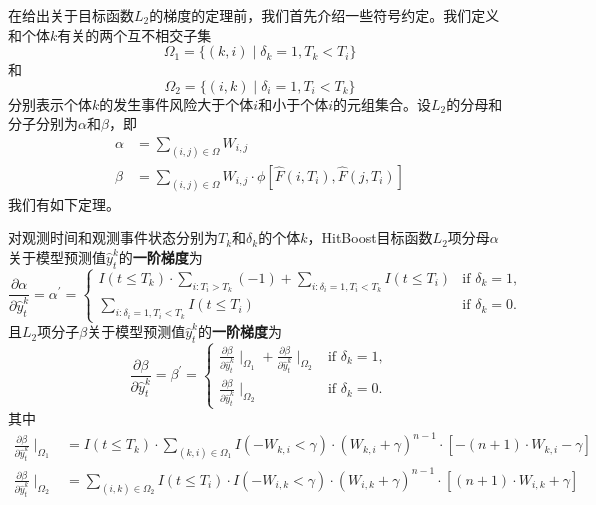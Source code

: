 在给出关于目标函数$L_2$的梯度的定理前，我们首先介绍一些符号约定。我们定义和个体$k$有关的两个互不相交子集\begin{equation}
\Omega_1=\{(k,i) \mid \delta_k=1,T_k < T_i\}
\end{equation}
和
\begin{equation}
\Omega_2=\{(i,k) \mid \delta_i=1,T_i < T_k\}
\end{equation}
分别表示个体$k$的发生事件风险大于个体$i$和小于个体$i$的元组集合。设$L_2$的分母和分子分别为$\alpha$和$\beta$，即
\begin{equation}
\begin{split}
\alpha &= \sum_{(i,j)\in \Omega} W_{i,j}\\
\beta &= \sum_{(i,j)\in \Omega} W_{i,j} \cdot \phi\left[ \hat{F}(i, T_i), \hat{F}(j, T_i) \right]
\end{split}
\end{equation}
我们有如下定理。

\begin{theorem}\label{thm:1.3}
对观测时间和观测事件状态分别为$T_k$和$\delta_k$的个体$k$，HitBoost目标函数$L_2$项分母$\alpha$关于模型预测值$\hat{y}_t^k$的\textbf{一阶梯度}为$$
\frac{\partial \alpha}{\partial \hat{y}_t^k}=\alpha^{'}=
\begin{cases}
I(t\le T_k)\cdot {\sum\limits_{i: T_i>T_k}(-1)} + \sum\limits_{i: \delta_i=1,T_i<T_k} I(t\le T_i) & \text{if } \delta_k = 1,\\
\sum\limits_{i: \delta_i=1,T_i<T_k} I(t\le T_i) & \text{if } \delta_k = 0.
\end{cases}
$$ 且$L_2$项分子$\beta$关于模型预测值$\hat{y}_t^k$的\textbf{一阶梯度}为$$
\frac{\partial \beta}{\partial \hat{y}_t^k}=\beta^{'}=
\begin{cases}
\frac{\partial \beta}{\partial \hat{y}_t^k} \mid_{\Omega_1} + \frac{\partial \beta}{\partial \hat{y}_t^k} \mid_{\Omega_2} & \text{if } \delta_k = 1,\\
\frac{\partial \beta}{\partial \hat{y}_t^k} \mid_{\Omega_2} & \text{if } \delta_k = 0.
\end{cases}
$$ 其中\[
\begin{split}
\frac{\partial \beta}{\partial \hat{y}_t^k} \mid_{\Omega_1} &= I(t\le T_k)\cdot \sum\limits_{(k,i)\in \Omega_1} {I(-W_{k,i}<\gamma)\cdot (W_{k,i}+\gamma)^{n-1}\cdot [-(n+1)\cdot W_{k,i}-\gamma]} \\
\frac{\partial \beta}{\partial \hat{y}_t^k} \mid_{\Omega_2} &= \sum\limits_{(i,k)\in \Omega_2} {I(t\le T_i)\cdot I(-W_{i,k}<\gamma)\cdot (W_{i,k}+\gamma)^{n-1}\cdot [(n+1)\cdot W_{i,k}+\gamma]}
\end{split}
\]
\end{theorem}

